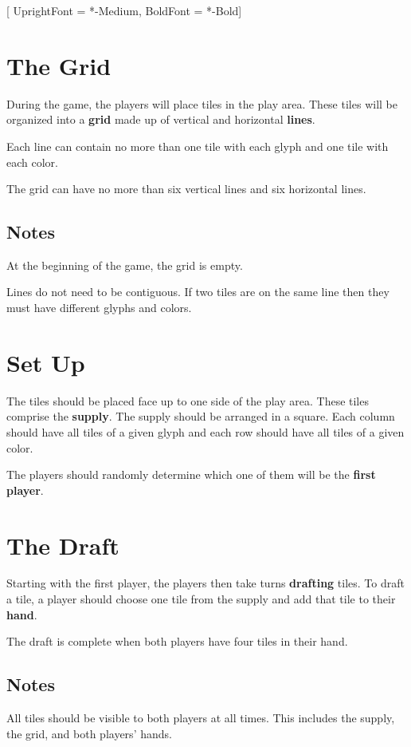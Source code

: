 \setmainfont{Quicksand}[
	UprightFont = *-Medium,
	BoldFont = *-Bold]
\raggedright

\section{The Grid}
%

During the game, the players will place tiles in the play area. These tiles will be organized into a \textbf{grid} made up of vertical and horizontal \textbf{lines}.

Each line can contain no more than one tile with each glyph and one tile with each color.

The grid can have no more than six vertical lines and six horizontal lines.

\subsection{Notes}
At the beginning of the game, the grid is empty.

Lines do not need to be contiguous.
If two tiles are on the same line then they must have different glyphs and colors.

\section{Set Up}
The tiles should be placed face up to one side of the play area. These tiles comprise the \textbf{supply}. The supply should be arranged in a square. Each column should have all tiles of a given glyph and each row should have all tiles of a given color.

The players should randomly determine which one of them will be the \textbf{first player}.

\section{The Draft}
Starting with the first player, the players then take turns \textbf{drafting} tiles. To draft a tile, a player should choose one tile from the supply and add that tile to their \textbf{hand}.

The draft is complete when both players have four tiles in their hand.

\subsection{Notes}
All tiles should be visible to both players at all times.  This includes the supply, the grid, and both players' hands.

